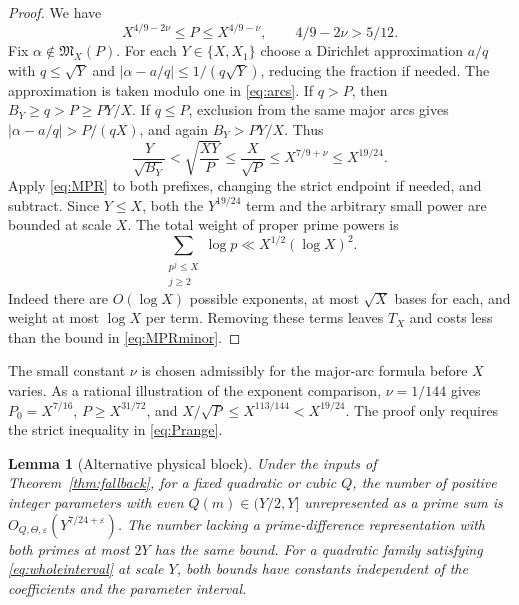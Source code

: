 \documentclass[11pt]{article}
\newtheorem{lemma}[theorem]{Lemma}
\theoremstyle{definition}
\theoremstyle{remark}
\numberwithin{equation}{section}
\newcommand{\eps}{\varepsilon}
\newcommand{\M}{\mathfrak M}
\begin{document}
\begin{proof}
We have
\begin{equation}\label{eq:Prange}
            X^{4/9-2\nu}\le P\le X^{4/9-\nu},
                       \qquad 4/9-2\nu>5/12.
\end{equation}
Fix $\alpha\notin\M_X(P)$. For each $Y\in\{X,X_1\}$ choose a
Dirichlet approximation $a/q$ with $q\le\sqrt Y$ and
$|\alpha-a/q|\le1/(q\sqrt Y)$, reducing the fraction if needed.
The approximation is taken modulo one in \eqref{eq:arcs}.
If $q>P$, then $B_Y\ge q>P\ge PY/X$. If $q\le P$, exclusion
from the same major arcs gives $|\alpha-a/q|>P/(qX)$, and again
$B_Y>PY/X$. Thus
\begin{equation}\label{eq:prefixineq}
 \frac{Y}{\sqrt{B_Y}}<\sqrt{\frac{XY}{P}}\le\frac{X}{\sqrt P}
                      \le X^{7/9+\nu}\le X^{19/24}.
\end{equation}
Apply \eqref{eq:MPR} to both prefixes, changing the strict endpoint
if needed, and subtract. Since $Y\le X$, both the $Y^{19/24}$ term
and the arbitrary small power are bounded at scale $X$.
The total weight of proper prime powers is
\begin{equation}\label{eq:primepowers}
          \sum_{\substack{p^j\le X\\j\ge2}}\log p
                         \ll X^{1/2}(\log X)^2.
\end{equation}
Indeed there are $O(\log X)$ possible exponents, at most $\sqrt X$
bases for each, and weight at most $\log X$ per term.
Removing these terms leaves $T_X$ and costs less than the bound in
\eqref{eq:MPRminor}.
\end{proof}

The small constant $\nu$ is chosen admissibly for the major-arc
formula before $X$ varies. As a rational illustration of the exponent
comparison, $\nu=1/144$ gives $P_0=X^{7/16}$,
$P\ge X^{31/72}$, and $X/\sqrt P\le X^{113/144}<X^{19/24}$.
The proof only requires the strict inequality in \eqref{eq:Prange}.

\begin{lemma}[Alternative physical block]\label{lem:fallbackphysical}
Under the inputs of Theorem~\ref{thm:fallback}, for a fixed quadratic
or cubic $Q$, the number of positive integer parameters with even
$Q(m)\in(Y/2,Y]$ unrepresented as a prime sum is
$O_{Q,\Theta,\eps}(Y^{7/24+\eps})$.
The number lacking a prime-difference representation with both primes
at most $2Y$ has the same bound. For a quadratic family satisfying
\eqref{eq:wholeinterval} at scale $Y$, both bounds have constants
independent of the coefficients and the parameter interval.
\end{lemma}
\end{document}
